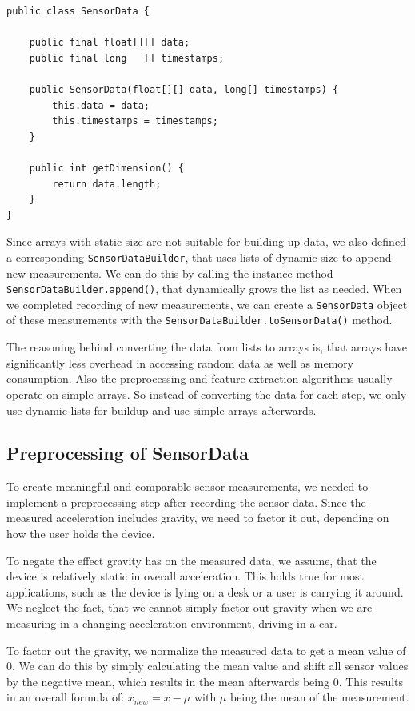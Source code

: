 \begin{lstlisting}[float,
caption={Class \lstinline$SensorData$ containing the raw sensor readings},
label={lst:sensordata}]
public class SensorData {
    
    public final float[][] data;
    public final long   [] timestamps;

    public SensorData(float[][] data, long[] timestamps) {
        this.data = data;
        this.timestamps = timestamps;
    }

    public int getDimension() {
        return data.length;
    }
}
\end{lstlisting}

Since arrays with static size are not suitable for building up data, we also defined a corresponding \lstinline$SensorDataBuilder$, that uses lists of dynamic size to append new measurements. We can do this by calling the instance method \lstinline$SensorDataBuilder.append()$, that dynamically grows the list as needed. When we completed recording of new measurements, we can create a \lstinline$SensorData$ object of these measurements with the \lstinline$SensorDataBuilder.toSensorData()$ method.

The reasoning behind converting the data from lists to arrays is, that arrays have significantly less overhead in accessing random data as well as memory consumption. Also the preprocessing and feature extraction algorithms usually operate on simple arrays. So instead of converting the data for each step, we only use dynamic lists for buildup and use simple arrays afterwards.

\subsection{Preprocessing of SensorData}
To create meaningful and comparable sensor measurements, we needed to implement a preprocessing step after recording the sensor data. Since the measured acceleration includes gravity, we need to factor it out, depending on how the user holds the device.

To negate the effect gravity has on the measured data, we assume, that the device is relatively static in overall acceleration. This holds true for most applications, such as the device is lying on a desk or a user is carrying it around. We neglect the fact, that we cannot simply factor out gravity when we are measuring in a changing acceleration environment, \eg driving in a car.

To factor out the gravity, we normalize the measured data to get a mean value of 0. We can do this by simply calculating the mean value and shift all sensor values by the negative mean, which results in the mean afterwards being 0. This results in an overall formula of: $ x_{new} = x - \mu $ with $\mu$ being the mean of the measurement.

